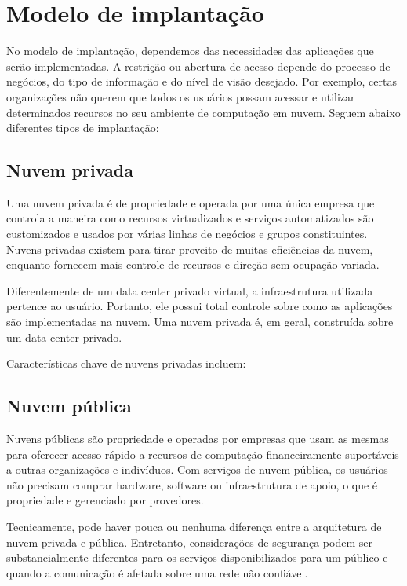 \section{Modelo de implantação}

No modelo de implantação, dependemos das necessidades das aplicações que serão
implementadas. A restrição ou abertura de acesso depende do processo de negócios,
do tipo de informação e do nível de visão desejado. Por exemplo, certas
organizações não querem que todos os usuários possam acessar e utilizar
determinados recursos no seu ambiente de computação em nuvem. Seguem abaixo
diferentes tipos de implantação:

\subsection{Nuvem privada}

Uma nuvem privada é de propriedade e operada por uma única empresa que controla a
maneira como recursos virtualizados e serviços automatizados são customizados e
usados por várias linhas de negócios e grupos constituintes. Nuvens privadas existem
para tirar proveito de muitas eficiências da nuvem, enquanto fornecem mais controle
de recursos e direção sem ocupação variada.

Diferentemente de um data center privado virtual, a infraestrutura utilizada
pertence ao usuário. Portanto, ele possui total controle sobre como as aplicações
são implementadas na nuvem. Uma nuvem privada é, em geral, construída sobre um data
center privado.

Características chave de nuvens privadas incluem:

\subsection{Nuvem pública}

Nuvens públicas são propriedade e operadas por empresas que usam as mesmas para
oferecer acesso rápido a recursos de computação financeiramente suportáveis a outras
organizações e indivíduos. Com serviços de nuvem pública, os usuários não precisam
comprar hardware, software ou infraestrutura de apoio, o que é propriedade e
gerenciado por provedores.

Tecnicamente, pode haver pouca ou nenhuma diferença entre a arquitetura de nuvem
privada e pública. Entretanto, considerações de segurança podem ser substancialmente
diferentes para os serviços disponibilizados para um público e quando a comunicação
é afetada sobre uma rede não confiável.

